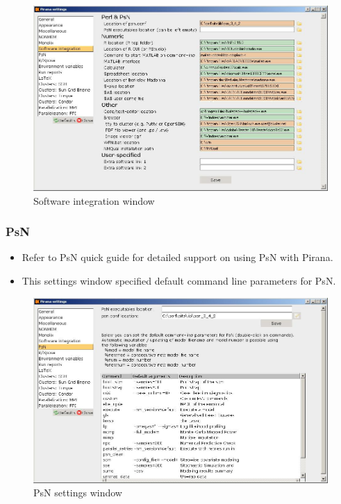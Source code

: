 \begin{figure}[h] \centering
    \includegraphics[scale=.4]{images/settings_2.jpg}
    \caption{Software integration window}
\end{figure}

\subsubsection*{PsN}
\begin{itemize}
\item Refer to PsN quick guide for detailed support on using PsN with Pirana.
\item This settings window specified default command line parameters for PsN.
\end{itemize}

\begin{figure}[h] \centering
    \includegraphics[scale=.4]{images/settings_3.jpg}
    \caption{PsN settings window}
\end{figure}

